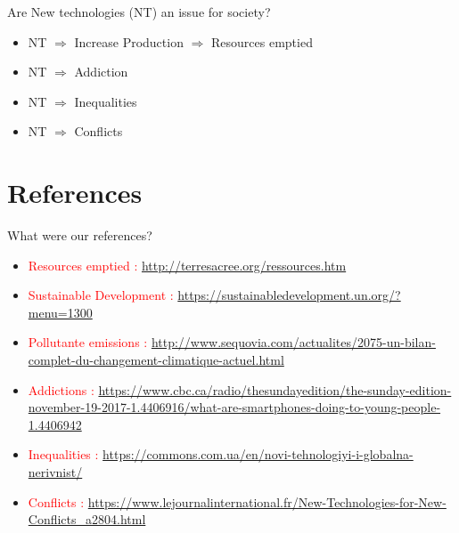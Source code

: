 \documentclass{beamer}
\begin{document}
 \begin{frame}
\begin{block}{Are New technologies (NT) an issue for society?} 
	\begin{itemize}
		[circle]
		\item NT $\Rightarrow$ Increase Production $\Rightarrow$ Resources emptied
		\item NT $\Rightarrow$ Addiction
		\item NT $\Rightarrow$ Inequalities
		\item NT $\Rightarrow$ Conflicts
	\end{itemize}
\end{block}
\end{frame}

\section{References}

 \begin{frame}
\begin{block}{What were our references?} 
	\begin{itemize}
		[circle]
		\item \textcolor{red}{Resources emptied :} \footnotesize \url{http://terresacree.org/ressources.htm} \normalsize
		\item \textcolor{red}{Sustainable Development :} \footnotesize \url{https://sustainabledevelopment.un.org/?menu=1300} \normalsize
		\item \textcolor{red}{Pollutante emissions :} \footnotesize \url{http://www.sequovia.com/actualites/2075-un-bilan-complet-du-changement-climatique-actuel.html}
		\normalsize
		\item \textcolor{red}{Addictions :} \footnotesize
		\url{https://www.cbc.ca/radio/thesundayedition/the-sunday-edition-november-19-2017-1.4406916/what-are-smartphones-doing-to-young-people-1.4406942} \normalsize
		\item \textcolor{red}{Inequalities :} \footnotesize \url{https://commons.com.ua/en/novi-tehnologiyi-i-globalna-nerivnist/} \normalsize
		\item \textcolor{red}{Conflicts :} \footnotesize
		\url{https://www.lejournalinternational.fr/New-Technologies-for-New-Conflicts_a2804.html} \normalsize
	\end{itemize}
\end{block}
\end{frame}
      
\end{document}
